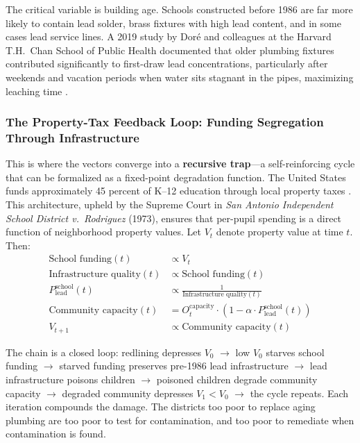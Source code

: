 \documentclass[12pt,openany]{book}
\begin{document}
The critical variable is building age. Schools constructed before 1986 are far more likely to contain lead solder, brass fixtures with high lead content, and in some cases lead service lines. A 2019 study by Dor\'{e} and colleagues at the Harvard T.H.\ Chan School of Public Health documented that older plumbing fixtures contributed significantly to first-draw lead concentrations, particularly after weekends and vacation periods when water sits stagnant in the pipes, maximizing leaching time \cite{tel_dore}.

\subsubsection{The Property-Tax Feedback Loop: Funding Segregation Through Infrastructure}

This is where the vectors converge into a \textbf{recursive trap}---a self-reinforcing cycle that can be formalized as a fixed-point degradation function. The United States funds approximately 45 percent of K--12 education through local property taxes \cite{tel_nces}. This architecture, upheld by the Supreme Court in \textit{San Antonio Independent School District v.\ Rodriguez} (1973), ensures that per-pupil spending is a direct function of neighborhood property values. Let $V_t$ denote property value at time $t$. Then:
\begin{align}
\text{School funding}(t) &\propto V_t \label{eq:funding}\\[4pt]
\text{Infrastructure quality}(t) &\propto \text{School funding}(t) \label{eq:infra}\\[4pt]
P_{\text{lead}}^{\text{school}}(t) &\propto \frac{1}{\text{Infrastructure quality}(t)} \label{eq:lead_school}\\[4pt]
\text{Community capacity}(t) &= O_t^{\text{capacity}} \cdot (1 - \alpha \cdot P_{\text{lead}}^{\text{school}}(t)) \label{eq:community}\\[4pt]
V_{t+1} &\propto \text{Community capacity}(t) \label{eq:propval}
\end{align}

The chain is a closed loop: redlining depresses $V_0$ $\rightarrow$ low $V_0$ starves school funding $\rightarrow$ starved funding preserves pre-1986 lead infrastructure $\rightarrow$ lead infrastructure poisons children $\rightarrow$ poisoned children degrade community capacity $\rightarrow$ degraded community depresses $V_1 < V_0$ $\rightarrow$ the cycle repeats. Each iteration compounds the damage. The districts too poor to replace aging plumbing are too poor to test for contamination, and too poor to remediate when contamination is found.
\end{document}
